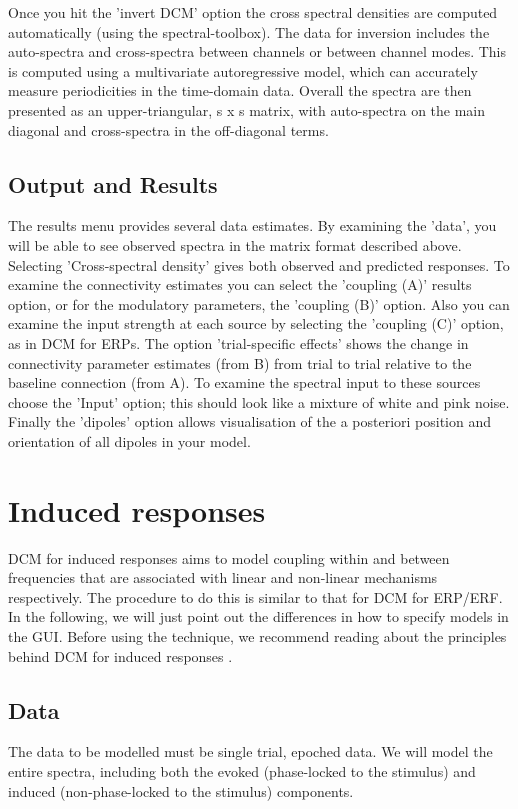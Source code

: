 Once you hit the 'invert DCM' option the cross spectral densities are computed automatically (using the spectral-toolbox). The data for inversion includes the auto-spectra and cross-spectra between channels or between channel modes. This is computed using a multivariate autoregressive model, which can accurately measure periodicities in the time-domain data. Overall the spectra are then presented as an upper-triangular, s x s matrix, with auto-spectra on the main diagonal and cross-spectra in the off-diagonal terms.

\subsection{Output and Results}
The results menu provides several data estimates. By examining the 'data', you will be able to see observed spectra in the matrix format described above. Selecting 'Cross-spectral density' gives both observed and predicted responses. To examine the connectivity estimates you can select the 'coupling (A)' results option, or for the modulatory parameters, the 'coupling (B)' option. Also you can examine the input strength at each source by selecting the 'coupling (C)' option, as in DCM for ERPs. The option 'trial-specific effects' shows the change in connectivity parameter estimates (from B) from trial to trial relative to the baseline connection (from A). To examine the spectral input to these sources choose the 'Input' option; this should look like a mixture of white and pink noise. Finally the 'dipoles' option allows visualisation of the a posteriori position and orientation of all dipoles in your model.

\section{Induced responses}
DCM for induced responses aims to model coupling within and between frequencies that are associated with linear and non-linear mechanisms respectively. The procedure to do this is similar to that for DCM for ERP/ERF. In the following, we will just point out the differences in how to specify models in the GUI. Before using the technique, we recommend reading about the principles behind DCM for induced responses \cite{cc_induced}.

\subsection{Data}
The data to be modelled must be single trial, epoched data. We will model the entire spectra, including both the evoked (phase-locked to the stimulus) and induced (non-phase-locked to the stimulus) components.

